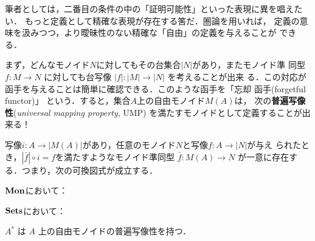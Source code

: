 筆者としては，二番目の条件の中の「証明可能性」といった表現に異を唱えたい．
もっと定義として精確な表現が存在する筈だ．圏論を用いれば，
定義の意味を汲みつつ，より曖昧性のない精確な「自由」の定義を与えることが
できる．

まず，どんなモノイド$N$に対してもその台集合$|N|$があり，またモノイド準
同型$f: M \to N$ に対しても台写像 $|f| : |M| \to |N|$ を考えることが出来
る．この対応が函手を与えることは簡単に確認できる．このような函手を「忘却
函手(forgetful functor)」
という．すると，集合$A$上の自由モノイド$M(A)$は，
次の{\bfseries 普遍写像性}({\itshape universal mapping property}, UMP)
を満たすモノイドとして定義することが出来る！

\begin{UMPofFreeMonoid}
 写像$i: A \to |M(A)|$があり，任意のモノイド$N$と写像$f: A \to |N|$が与え
 られたとき，$|\bar f|\circ i = f$を満たすようなモノイド準同型 $\bar f:
 M(A) \to N$ が一意に存在する．つまり，次の可換図式が成立する．

 $\mathbf{Mon}$において：
 \begin{center}
 \end{center}

 $\mathbf{Sets}$において：
 \begin{center}
 \end{center}
\end{UMPofFreeMonoid}
\begin{prop}
 $A^*$ は $A$ 上の自由モノイドの普遍写像性を持つ．
\end{prop}
